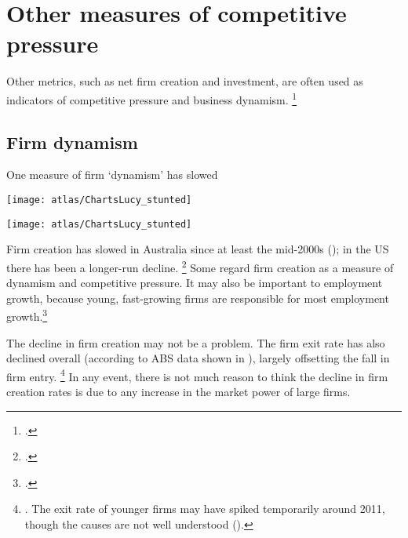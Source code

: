 \section{Other measures of competitive pressure}

Other metrics, such as net firm creation and investment, are often used as indicators of competitive pressure and business dynamism.%
\footcites{CEAcompetitionbriefmay2016}{Leigh-triggs-AER}

\subsection{Firm dynamism}

\begin{figureTop}
    \caption{One measure of firm `dynamism' has slowed\label{fig:dynamism}}
     \vspace{3pt}
    \texttt{[image: atlas/ChartsLucy\_stunted]}\vspace{5pt}

    \texttt{[image: atlas/ChartsLucy\_stunted]}
\end{figureTop}

Firm creation has slowed in Australia since at least the mid-2000s (); in the US there has been a longer-run decline.%
\footcites{CEAcompetitionbriefmay2016, Furman_preso_2016}
Some regard firm creation as a measure of dynamism and competitive pressure. It may also be important to employment growth, because young, fast-growing firms are responsible for most employment growth.\footcite{Industry_2015}

The decline in firm creation may not be a problem. The firm exit rate has also declined overall (according to ABS data shown in ), largely offsetting the fall in firm entry.%
    \footnote{\textcites{Breunig_2007}{IllusionsEntrepreneur2010}.
The exit rate of younger firms may have spiked temporarily around 2011, though the causes are not well understood (\textcite{Bakhtiari_2017}).}
In any event, there is not much reason to think the decline in firm creation rates is due to any increase in the market power of large firms.


